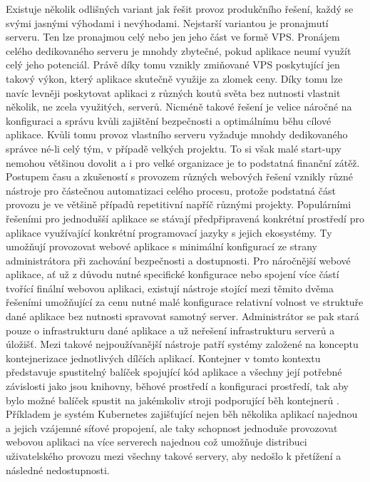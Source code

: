 		Existuje několik odlišných variant jak řešit provoz produkčního řešení, každý se svými jasnými výhodami i nevýhodami.
		Nejstarší variantou je pronajmutí serveru.
		Ten lze pronajmou celý nebo jen jeho část ve formě \noindent\Ac{VPS}.
		Pronájem celého dedikovaného serveru je mnohdy zbytečné, pokud aplikace neumí využít celý jeho potenciál.
		Právě díky tomu vznikly zmiňované \noindent\Ac{VPS} poskytující jen takový výkon, který aplikace skutečně využije za
		zlomek ceny.
		Díky tomu lze navíc levněji poskytovat aplikaci z různých koutů světa bez nutnosti vlastnit několik, ne zcela
		využitých, serverů.
		Nicméně takové řešení je velice náročné na konfiguraci a správu kvůli zajištění bezpečnosti a optimálnímu běhu cílové
		aplikace.
		Kvůli tomu provoz vlastního serveru vyžaduje mnohdy dedikovaného správce né-li celý tým, v případě velkých projektu.
		To si však malé start-upy nemohou většinou dovolit a i pro velké organizace je to podstatná finanční zátěž.
		Postupem času a zkušeností s provozem různých webových řešení vznikly různé nástroje pro částečnou automatizaci
		celého procesu, protože podstatná část provozu je ve většině případů repetitivní napříč různými projekty.
		Populárními řešeními pro jednodušší aplikace se stávají předpřipravená konkrétní prostředí pro aplikace využívající
		konkrétní programovací jazyky s jejich ekosystémy.
		Ty umožňují provozovat webové aplikace s minimální konfigurací ze strany administrátora při zachování bezpečnosti
		a dostupnosti.
		Pro náročnější webové aplikace, ať už z důvodu nutné specifické konfigurace nebo spojení více částí tvořící finální
		webovou aplikaci, existují nástroje stojící mezi těmito dvěma řešeními umožňující za cenu nutné malé konfigurace
		relativní volnost ve struktuře dané aplikace bez nutnosti spravovat samotný server.
		Administrátor se pak stará pouze o infrastrukturu dané aplikace a už neřešení infrastrukturu serverů a úložišť.
		Mezi takové nejpoužívanější nástroje patří systémy založené na konceptu kontejnerizace jednotlivých dílčích aplikací.
		Kontejner v tomto kontextu představuje spustitelný balíček spojující kód aplikace a všechny její potřebné závislosti jako jsou
		knihovny, běhové prostředí a konfiguraci prostředí, tak aby bylo možné balíček spustit na jakémkoliv stroji podporující
		běh kontejnerů \cite{what_is_container}.
		Příkladem je systém Kubernetes zajišťující nejen běh několika aplikací najednou a jejich vzájemné síťové propojení,
		ale taky schopnost jednoduše provozovat webovou aplikaci na více serverech najednou což umožňuje distribuci
		uživatelského provozu mezi všechny takové servery, aby nedošlo k přetížení a následné nedostupnosti.
